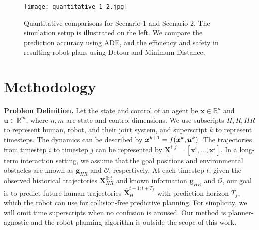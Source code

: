 \begin{figure*}[ht]
    \centering
    \texttt{[image: quantitative\_1\_2.jpg]}
    \vspace{-5mm}
    \caption{Quantitative comparisons for Scenario 1 and Scenario 2. The simulation setup is illustrated on the left. We compare the prediction accuracy using ADE, and the efficiency and safety in resulting robot plans using Detour and Minimum Distance.}
    \vspace{-5mm}
    \label{fig:quantitative_12}
\end{figure*}

\section{Methodology}
\textbf{Problem Definition.} 
Let the state and control of an agent be $\boldsymbol{x} \in \mathds{R}^{n}$ and $\boldsymbol{u} \in \mathds{R}^{m}$, where $n, m$ are state and control dimensions. 
We use subscripts $H, R, HR$ to represent human, robot, and their joint system, and superscript $k$ to represent timesteps.
The dynamics can be described by $\boldsymbol{x}^{k+1} = f(\boldsymbol{x}^{k}, \boldsymbol{u}^{k})$.
The trajectories from timestep $i$ to timestep $j$ can be represented by $\boldsymbol{X}^{i:j} = [\boldsymbol{x}^{i}, \dots, \boldsymbol{x}^{j}]$.
In a long-term interaction setting, we assume that the goal positions and environmental obstacles are known as $\boldsymbol{g}_{HR}$ and $\mathcal{O}$, respectively.
At each timestep $t$, given the observed historical trajectories $\boldsymbol{X}_{HR}^{0:t}$ and known information $\boldsymbol{g}_{HR}$ and $\mathcal{O}$, our goal is to predict future human trajectories $\hat{\boldsymbol{X}}_{H}^{t+1:t+T_{f}}$ with prediction horizon $T_{f}$, which the robot can use for collision-free predictive planning. 
For simplicity, we will omit time superscripts when no confusion is aroused. Our method is planner-agnostic and the robot planning algorithm is outside the scope of this work. 


